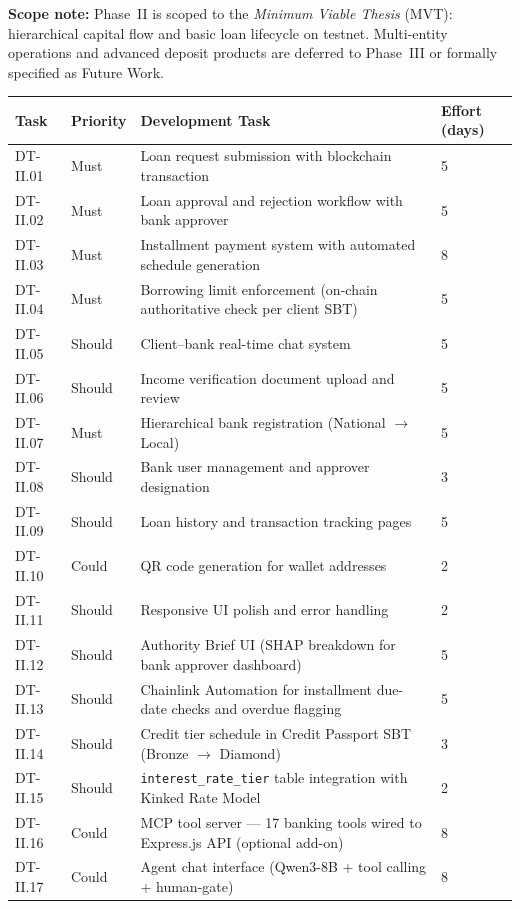 \documentclass[12pt,a4paper]{report}
\newcommand{\tableheadcolor}{\rowcolor{TableHeadBg}}
\begin{document}
\textbf{Scope note:} Phase~II is scoped to the \textit{Minimum Viable Thesis} (MVT): hierarchical capital flow and basic loan lifecycle on testnet. Multi-entity operations and advanced deposit products are deferred to Phase~III or formally specified as Future Work.

\begin{table}[H]
\centering
\begin{tabular}{p{1.8cm}p{1.8cm}p{7.5cm}p{1.5cm}}
\toprule
\tableheadcolor
\textbf{Task} & \textbf{Priority} & \textbf{Development Task} & \textbf{Effort (days)} \\
\midrule
DT-II.01 & Must & Loan request submission with blockchain transaction & 5 \\
DT-II.02 & Must & Loan approval and rejection workflow with bank approver & 5 \\
DT-II.03 & Must & Installment payment system with automated schedule generation & 8 \\
DT-II.04 & Must & Borrowing limit enforcement (on-chain authoritative check per client SBT) & 5 \\
DT-II.05 & Should & Client--bank real-time chat system & 5 \\
DT-II.06 & Should & Income verification document upload and review & 5 \\
DT-II.07 & Must & Hierarchical bank registration (National $\to$ Local) & 5 \\
DT-II.08 & Should & Bank user management and approver designation & 3 \\
DT-II.09 & Should & Loan history and transaction tracking pages & 5 \\
DT-II.10 & Could & QR code generation for wallet addresses & 2 \\
DT-II.11 & Should & Responsive UI polish and error handling & 2 \\
DT-II.12 & Should & Authority Brief UI (SHAP breakdown for bank approver dashboard) & 5 \\
DT-II.13 & Should & Chainlink Automation for installment due-date checks and overdue flagging & 5 \\
DT-II.14 & Should & Credit tier schedule in Credit Passport SBT (Bronze $\to$ Diamond) & 3 \\
DT-II.15 & Should & \texttt{interest\_rate\_tier} table integration with Kinked Rate Model & 2 \\
DT-II.16 & Could & MCP tool server --- 17 banking tools wired to Express.js API (optional add-on) & 8 \\
DT-II.17 & Could & Agent chat interface (Qwen3-8B + tool calling + human-gate) & 8 \\

\end{tabular}
\end{table}
\end{document}
